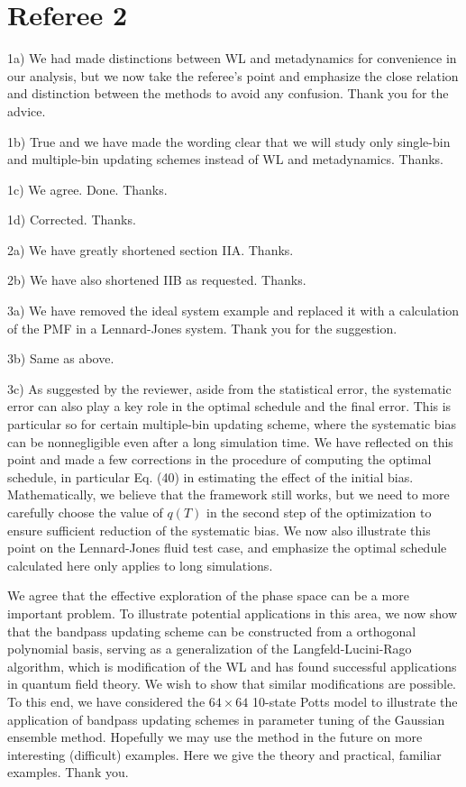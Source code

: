 \documentclass{article}
\begin{document}
\section{Referee 2}

1a) We had made distinctions between WL and metadynamics for convenience in our analysis,
but we now take the referee's point and emphasize the close relation and distinction between the methods to avoid any confusion. Thank you for the advice.

1b) True and we have made the wording clear that we will study only single-bin and multiple-bin updating schemes instead of WL and metadynamics. Thanks.

1c) We agree. Done. Thanks.

1d) Corrected. Thanks.

2a) We have greatly shortened section IIA. Thanks.

2b) We have also shortened IIB as requested. Thanks.

3a) We have removed the ideal system example and replaced it with a calculation of the PMF in a Lennard-Jones system. Thank you for the suggestion.

3b) Same as above.

3c) As suggested by the reviewer, aside from the statistical error, the systematic error can also play a key role in the optimal schedule and the final error.  This is particular so for certain multiple-bin updating scheme, where the systematic bias can be nonnegligible even after a long simulation time. We have reflected on this point and made a few corrections in the procedure of computing the optimal schedule, in particular Eq. (40) in estimating the effect of the initial bias. Mathematically, we believe that the framework still works, but we need to more carefully choose the value of $q(T)$ in the second step of the optimization to ensure sufficient reduction of the systematic bias.  We now also illustrate this point on the Lennard-Jones fluid test case, and emphasize the optimal schedule calculated here only applies to long simulations.

We agree that the effective exploration of the phase space can be a more important problem. To illustrate potential applications in this area, we now show that the bandpass updating scheme can be constructed from a orthogonal polynomial basis, serving as a generalization of the Langfeld-Lucini-Rago algorithm, which is modification of the WL and has found successful applications in quantum field theory. We wish to show that similar modifications are possible. To this end, we have considered the $64\times64$ 10-state Potts model to illustrate the application of bandpass updating schemes in parameter tuning of the Gaussian ensemble method. Hopefully we may use the method in the future on more interesting (difficult) examples. Here we give the theory and practical, familiar examples. Thank you.
\end{document}
